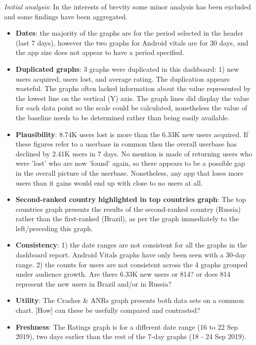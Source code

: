 \textit{Initial analysis}: In the interests of brevity some minor analysis has been excluded and some findings have been aggregated. 

\begin{itemize}
    \item \textbf{Dates}: the majority of the graphs are for the period selected in the header (last 7 days), however the two graphs for Android vitals are for 30 days, and the app size does not appear to have a period specified.
    \item \textbf{Duplicated graphs}: 3 graphs were duplicated in this dashboard: 1) new users acquired, users lost, and average rating. The duplication appears wasteful. The graphs often lacked information about the value represented by the lowest line on the vertical (Y) axis. The graph lines did display the value for each data point so the scale could be calculated, nonetheless the value of the baseline needs to be determined rather than being easily available.
    \item \textbf{Plausibility}: 8.74K users lost is more than the 6.33K new users acquired. If these figures refer to a userbase in common then the overall userbase has declined by 2.41K users in 7 days. No mention is made of returning users who were 'lost' who are now 'found' again, so there appears to be a possible gap in the overall picture of the userbase. Nonetheless, any app that loses more users than it gains would end up with close to no users at all.
    \item \textbf{Second-ranked country highlighted in top countries graph}: The top countries graph presents the results of the second-ranked country (Russia) rather than the first-ranked (Brazil), as per the graph immediately to the left/preceding this graph. 
    \item \textbf{Consistency}: 1) the date ranges are not consistent for all the graphs in the dashboard report. Android Vitals graphs have only been seen with a 30-day range. 2) the counts for users are not consistent across the 4 graphs grouped under audience growth. Are there 6.33K new users or 814? or does 814 represent the new users in Brazil and/or in Russia?
    \item \textbf{Utility}: The Crashes \& ANRs graph presents both data sets on a common chart. [How] can these be usefully compared and contrasted? 
    \item \textbf{Freshness}: The Ratings graph is for a different date range (16 to 22 Sep 2019), two days earlier than the rest of the 7-day graphs (18 - 24 Sep 2019). 
\end{itemize}


